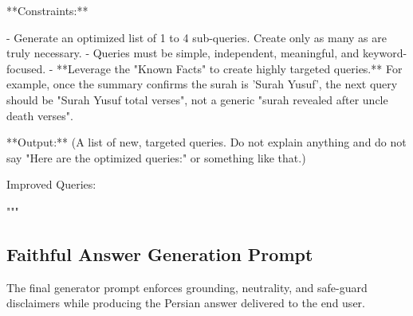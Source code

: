 \documentclass[11pt]{article}
\begin{document}
\begin{PromptBlock}
**Constraints:**

- Generate an optimized list of 1 to 4 sub-queries. Create only as many as are truly necessary.
- Queries must be simple, independent, meaningful, and keyword-focused.
- **Leverage the "Known Facts" to create highly targeted queries.** For example, once the summary confirms the surah is 'Surah Yusuf', the next query should be "Surah Yusuf total verses", not a generic "surah revealed after uncle death verses".

**Output:** (A list of new, targeted queries. Do not explain anything and do not say "Here are the optimized queries:" or something like that.)

Improved Queries:

"""
\end{PromptBlock}

\subsection{Faithful Answer Generation Prompt}

The final generator prompt enforces grounding, neutrality, and safe-guard disclaimers while producing the Persian answer delivered to the end user.
\end{document}
